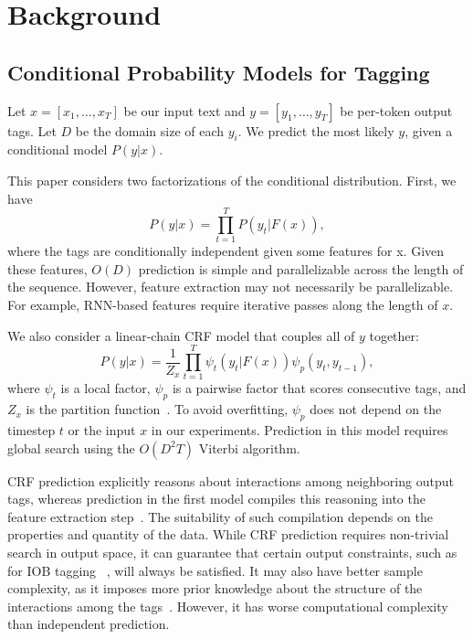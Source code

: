 \section{Background}
\subsection{Conditional Probability Models for Tagging}
\label{sec:prob-model}
Let $x = [x_1, \ldots, x_T]$ be our input text and $y = [y_1, \ldots, y_T]$ be per-token output tags. Let $D$ be the domain size of each $y_i$. We predict the most likely $y$, given a conditional model $P(y | x)$. 

This paper considers two factorizations of the conditional distribution. First, we have
\begin{equation}
P(y | x) = \prod_{t = 1}^T P(y_t | F(x)),
\label{eq:cond-ind}
\end{equation}
where the tags are conditionally independent given some features for x. Given these features, $O(D)$ prediction is simple and parallelizable across the length of the sequence. However, feature extraction may not necessarily be parallelizable. For example, RNN-based features require iterative passes along the length of $x$.

We also consider a linear-chain CRF model that couples all of $y$ together:
\begin{equation}
P(y | x) = \frac{1}{Z_x} \prod_{t = 1}^T \psi_t(y_t | F(x)) \psi_p(y_t,y_{t-1}),\label{eq:crf}
\end{equation}
where $\psi_{t}$ is a local factor, $\psi_p$ is a pairwise factor that scores consecutive tags, and $Z_x$ is the partition function~\citep{lafferty2001conditional}. To avoid overfitting, $\psi_p$ does not depend on the timestep $t$ or the input $x$ in our experiments. Prediction in this model requires global search using the $O(D^2 T)$ Viterbi algorithm. 

CRF prediction explicitly reasons about interactions among neighboring output tags, whereas prediction in the first model compiles this reasoning into the feature extraction step~\citep{liang2008structure}. The suitability of such compilation depends on the properties and quantity of the data. While CRF prediction requires non-trivial search in output space, it can guarantee that certain output constraints, such as for IOB tagging ~\citep{ramshaw1999text}, will always be satisfied. It may also have better sample complexity, as it imposes more prior knowledge about the structure of the interactions among the tags~\citep{JMLR:v17:15-501}. However, it has worse computational complexity than independent prediction.

